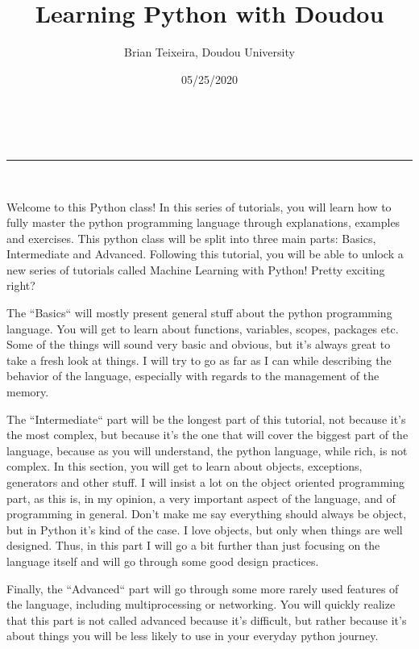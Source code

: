 \documentclass[a4paper,11pt]{article}
\makeatletter
\newcommand{\linia}{\rule{\linewidth}{0.5pt}}
\theoremstyle{mytheor}
\renewcommand{\maketitle}{
\begin{center}
\vspace{2ex}
{\huge \textsc{\@title}}
\vspace{1ex}
\\
\linia\\
\@author \hfill \@date
\vspace{4ex}
\end{center}
}
\makeatother
\begin{document}
\title{Learning Python with Doudou}

\author{Brian Teixeira, Doudou University}

\date{05/25/2020}

\maketitle

Welcome to this Python class! In this series of tutorials, you will
learn how to fully master the python programming language through
explanations, examples and exercises. This python class will be split
into three main parts: Basics, Intermediate and Advanced. Following
this tutorial, you will be able to unlock a new series of tutorials
called Machine Learning with Python! Pretty exciting right?

\vspace{5mm}

The ``Basics`` will mostly present general stuff about the python
programming language. You will get to learn about functions,
variables, scopes, packages etc. Some of the things will sound very
basic and obvious, but it's always great to take a fresh look at things.
I will try to go as far as I can while describing the behavior of the
language, especially with regards to the management of the memory.

\vspace{5mm}

The ``Intermediate`` part will be the longest part of this tutorial,
not because it's the most complex, but because it's the one that
will cover the biggest part of the language, because as you will understand,
the python language, while rich, is not complex. In this section, you will
get to learn about objects, exceptions, generators and other stuff. I will
insist a lot on the object oriented programming part, as this is, in my
opinion, a very important aspect of the language, and of programming in general.
Don't make me say everything should always be object, but in Python it's kind
of the case. I love objects, but only when things are well designed. Thus,
in this part I will go a bit further than just focusing on the language itself
and will go through some good design practices.

\vspace{5mm}

Finally, the ``Advanced`` part will go through some more rarely used features
of the language, including multiprocessing or networking. You will quickly
realize that this part is not called advanced because it's difficult, but rather
because it's about things you will be less likely to use in your everyday
python journey.
\end{document}
